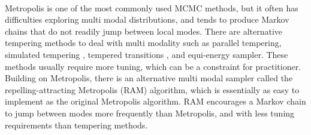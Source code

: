 \documentclass{article}
\begin{document}
\paragraph{}Metropolis is one of the most commonly used MCMC methods, but it often has difficulties exploring multi modal distributions, and tends to produce Markov chains that do not readily jump between local modes. There are alternative tempering methods to deal with multi modality  such as parallel tempering, simulated tempering , tempered transitions , and equi-energy sampler. %
These methods usually require more tuning, which can be a constraint for practitioner.%
Building on Metropolis, there is an alternative multi modal sampler called the repelling-attracting Metropolis
(RAM) algorithm, which is essentially as easy to implement as
the original Metropolis algorithm. RAM encourages a Markov
chain to jump between modes more frequently than Metropolis, and with less tuning requirements than tempering methods.
\end{document}
